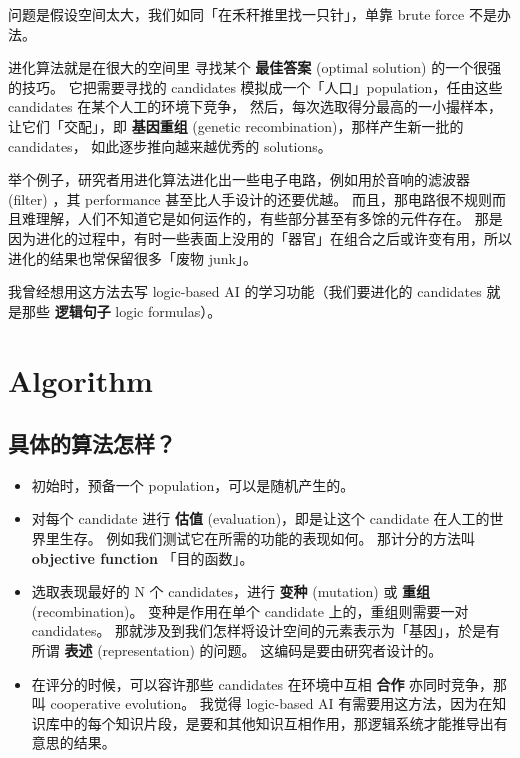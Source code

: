 \documentclass[orivec]{llncs}
\begin{document}
问题是假设空间太大，我们如同「在禾秆推里找一只针」，单靠 brute force 不是办法。

进化算法就是在很大的空间里 寻找某个 \textbf{最佳答案} (optimal solution) 的一个很强的技巧。 它把需要寻找的 candidates 模拟成一个「人口」population，任由这些 candidates 在某个人工的环境下竞争， 然后，每次选取得分最高的一小撮样本，让它们「交配」，即 \textbf{基因重组} (genetic recombination)，那样产生新一批的  candidates， 如此逐步推向越来越优秀的 solutions。

举个例子，研究者用进化算法进化出一些电子电路，例如用於音响的滤波器 (filter) ，其 performance 甚至比人手设计的还要优越。  而且，那电路很不规则而且难理解，人们不知道它是如何运作的，有些部分甚至有多馀的元件存在。  那是因为进化的过程中，有时一些表面上没用的「器官」在组合之后或许变有用，所以进化的结果也常保留很多「废物 junk」。

我曾经想用这方法去写 logic-based AI 的学习功能（我们要进化的 candidates 就是那些 \textbf{逻辑句子} logic formulas）。

\section{Algorithm}

\subsection{具体的算法怎样？}

\let\labelitemi\labelitemii
\begin{itemize}
\item 初始时，预备一个 population，可以是随机产生的。
\item 对每个 candidate 进行 \textbf{估值} (evaluation)，即是让这个 candidate 在人工的世界里生存。  例如我们测试它在所需的功能的表现如何。  那计分的方法叫 \textbf{objective function} 「目的函数」。
\item 选取表现最好的 N 个 candidates，进行 \textbf{变种} (mutation) 或 \textbf{重组} (recombination)。  变种是作用在单个 candidate 上的，重组则需要一对 candidates。  那就涉及到我们怎样将设计空间的元素表示为「基因」，於是有所谓 \textbf{表述} (representation) 的问题。  这编码是要由研究者设计的。
\item 在评分的时候，可以容许那些 candidates 在环境中互相 \textbf{合作} 亦同时竞争，那叫 cooperative evolution。   我觉得 logic-based AI 有需要用这方法，因为在知识库中的每个知识片段，是要和其他知识互相作用，那逻辑系统才能推导出有意思的结果。  
\end{itemize}
\end{document}
